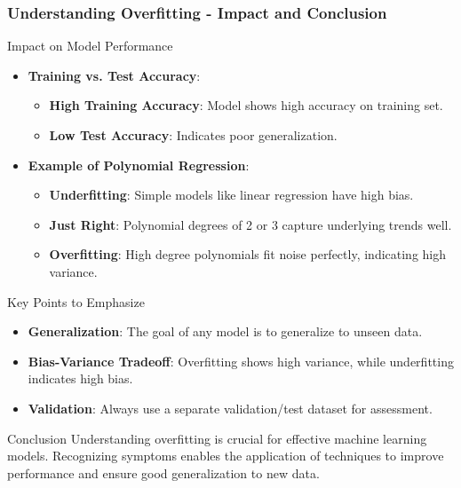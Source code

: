 \documentclass[aspectratio=169]{beamer}
\begin{document}
\begin{frame}[fragile]
    \frametitle{Understanding Overfitting - Impact and Conclusion}
    \begin{block}{Impact on Model Performance}
        \begin{itemize}
            \item \textbf{Training vs. Test Accuracy}:
                \begin{itemize}
                    \item \textbf{High Training Accuracy}: Model shows high accuracy on training set.
                    \item \textbf{Low Test Accuracy}: Indicates poor generalization.
                \end{itemize}
            \item \textbf{Example of Polynomial Regression}:
                \begin{itemize}
                    \item \textbf{Underfitting}: Simple models like linear regression have high bias.
                    \item \textbf{Just Right}: Polynomial degrees of 2 or 3 capture underlying trends well.
                    \item \textbf{Overfitting}: High degree polynomials fit noise perfectly, indicating high variance.
                \end{itemize}
        \end{itemize}
    \end{block}

    \begin{block}{Key Points to Emphasize}
        \begin{itemize}
            \item \textbf{Generalization}: The goal of any model is to generalize to unseen data.
            \item \textbf{Bias-Variance Tradeoff}: Overfitting shows high variance, while underfitting indicates high bias.
            \item \textbf{Validation}: Always use a separate validation/test dataset for assessment.
        \end{itemize}
    \end{block}

    \begin{block}{Conclusion}
        Understanding overfitting is crucial for effective machine learning models. Recognizing symptoms enables the application of techniques to improve performance and ensure good generalization to new data.
    \end{block}
\end{frame}
\end{document}

